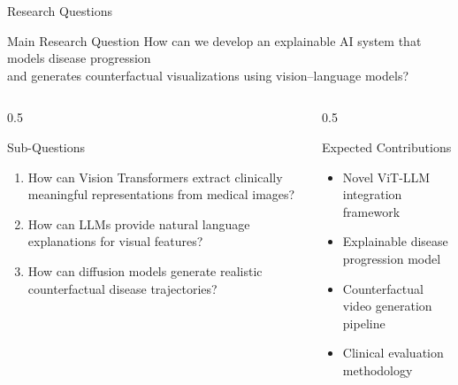 \documentclass[aspectratio=169]{beamer}
\begin{document}
\begin{frame}{Research Questions}
    \begin{alertblock}{Main Research Question}
        \centering
        \large How can we develop an explainable AI system that models disease progression \\
        and generates counterfactual visualizations using vision–language models?
    \end{alertblock}
    
    \vspace{1em}
    
    \begin{columns}
        \begin{column}{0.5\textwidth}
            \begin{block}{Sub-Questions}
                \begin{enumerate}
                    \item How can Vision Transformers extract clinically meaningful representations from medical images?
                    \item How can LLMs provide natural language explanations for visual features?
                    \item How can diffusion models generate realistic counterfactual disease trajectories?
                \end{enumerate}
            \end{block}
        \end{column}
        \begin{column}{0.5\textwidth}
            \begin{block}{Expected Contributions}
                \begin{itemize}
                    \item Novel ViT-LLM integration framework
                    \item Explainable disease progression model
                    \item Counterfactual video generation pipeline
                    \item Clinical evaluation methodology
                \end{itemize}
            \end{block}
        \end{column}
    \end{columns}
\end{frame}
\end{document}
